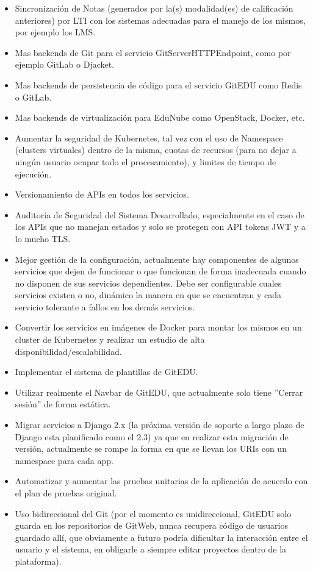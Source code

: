 \begin{itemize}
\begin{itemize}
    \end{itemize}
    \item Sincronización de Notas (generados por la(s) modalidad(es) de calificación anteriores) por LTI con los sistemas adecuadas para el manejo de los mismos, por ejemplo los LMS.
    \item Mas backends de Git para el servicio GitServerHTTPEndpoint, como por ejemplo GitLab o Djacket.
    \item Mas backends de persistencia de código para el servicio GitEDU como Redis o GitLab.
    \item Mas backends de virtualización para EduNube como OpenStack, Docker, etc.
    \item Aumentar la seguridad de Kubernetes, tal vez con el uso de Namespace (clusters virtuales) dentro de la misma, cuotas de recursos (para no dejar a ningún usuario ocupar todo el procesamiento), y limites de tiempo de ejecución.
    \item Versionamiento de APIs en todos los servicios.
    \item Auditoría de Seguridad del Sistema Desarrollado, especialmente en el caso de los APIs que no manejan estados y solo se protegen con API tokens JWT y a lo mucho TLS.
    \item Mejor gestión de la configuración, actualmente hay componentes de algunos servicios que dejen de funcionar o que funcionan de forma inadecuada cuando no disponen de sus servicios dependientes. Debe ser configurable cuales servicios existen o no, dinámico la manera en que se encuentran y cada servicio tolerante a fallos en los demás servicios.
    \item Convertir los servicios en imágenes de Docker para montar los mismos en un cluster de Kubernetes y realizar un estudio de alta disponibilidad/escalabilidad.
    \item Implementar el sistema de plantillas de GitEDU.
    \item Utilizar realmente el Navbar de GitEDU, que actualmente solo tiene ''Cerrar sesión'' de forma estática.
    \item Migrar servicios a Django 2.x (la próxima versión de soporte a largo plazo de Django esta planificado como el 2.3) ya que en realizar esta migración de versión, actualmente se rompe la forma en que se llevan los URIs con un namespace para cada app.
    \item Automatizar y aumentar las pruebas unitarias de la aplicación de acuerdo con el plan de pruebas original.
    \item Uso bidireccional del Git (por el momento es unidireccional, GitEDU solo guarda en los repositorios de GitWeb, nunca recupera código de usuarios guardado allí, que obviamente a futuro podría dificultar la interacción entre el usuario y el sistema, en obligarle a siempre editar proyectos dentro de la plataforma).

\end{itemize}

